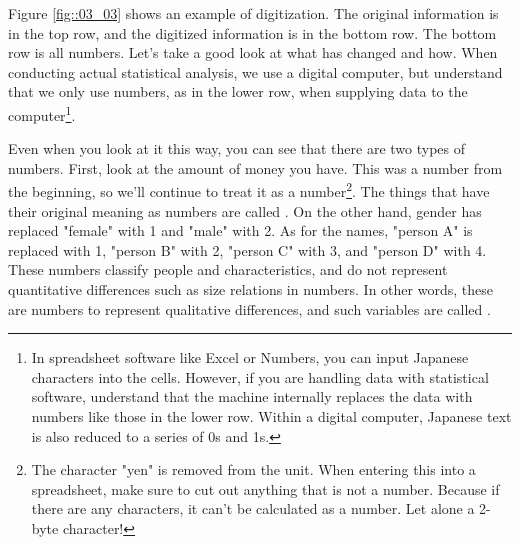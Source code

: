\documentclass{ltjsbook}
\begin{document}
Figure \ref{fig::03_03} shows an example of digitization. The original information is in the top row, and the digitized information is in the bottom row. The bottom row is all numbers. Let's take a good look at what has changed and how. When conducting actual statistical analysis, we use a digital computer, but understand that we only use numbers, as in the lower row, when supplying data to the computer\footnote{In spreadsheet software like Excel or Numbers, you can input Japanese characters into the cells. However, if you are handling data with statistical software, understand that the machine internally replaces the data with numbers like those in the lower row. Within a digital computer, Japanese text is also reduced to a series of 0s and 1s.}.

Even when you look at it this way, you can see that there are two types of numbers. First, look at the amount of money you have. This was a number from the beginning, so we'll continue to treat it as a number\footnote{The character "yen" is removed from the unit. When entering this into a spreadsheet, make sure to cut out anything that is not a number. Because if there are any characters, it can't be calculated as a number. Let alone a 2-byte character!}. The things that have their original meaning as numbers are called . On the other hand, gender has replaced "female" with 1 and "male" with 2. As for the names, "person A" is replaced with 1, "person B" with 2, "person C" with 3, and "person D" with 4. These numbers classify people and characteristics, and do not represent quantitative differences such as size relations in numbers. In other words, these are numbers to represent qualitative differences, and such variables are called .
\end{document}
